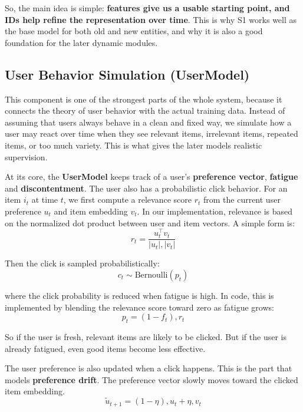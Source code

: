 So, the main idea is simple: \textbf{features give us a usable starting point, and IDs help refine the representation over time}.
This is why S1 works well as the base model for both old and new entities, and why it is also a good foundation for the later dynamic modules.



\subsection{User Behavior Simulation (UserModel)}

This component is one of the strongest parts of the whole system, 
because it connects the theory of user behavior with the actual training data. 
Instead of assuming that users always behave in a clean and fixed way, 
we simulate how a user may react over time when they see relevant items, 
irrelevant items, repeated items, or too much variety. 
This is what gives the later models realistic supervision.

At its core, the \textbf{UserModel} keeps track of a user's \textbf{preference vector}, \textbf{fatigue} and \textbf{discontentment}. 
The user also has a probabilistic click behavior. For an item $i_t$ at time $t$, 
we first compute a relevance score $r_t$ from the current user preference $u_t$ and item embedding $v_t$. 
In our implementation, relevance is based on the normalized dot product between user and item vectors. 
A simple form is:
\begin{equation}
    r_t = \frac{u_t^\top v_t}{|u_t| , |v_t|}
\end{equation}

Then the click is sampled probabilistically:
\begin{equation}
    c_t \sim \text{Bernoulli}(p_t)
\end{equation}

where the click probability is reduced when fatigue is high. 
In code, this is implemented by blending the relevance score toward zero as fatigue grows:
\begin{equation}
    p_t = (1 - f_t), r_t
\end{equation}

So if the user is fresh, relevant items are likely to be clicked.
But if the user is already fatigued, even good items become less effective.

The user preference is also updated when a click happens.
This is the part that models \textbf{preference drift}.
The preference vector slowly moves toward the clicked item embedding. 
\begin{equation}
    \tilde{u}_{t+1} = (1-\eta),u_t + \eta,v_t
\end{equation}

